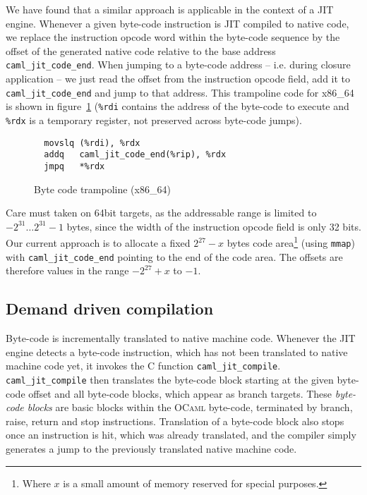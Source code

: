 \documentclass[10pt,a4paper,twocolumn]{article}
\begin{document}
We have found that a similar approach is applicable in the context of a JIT engine. Whenever a
given byte-code instruction is JIT compiled to native code, we replace the instruction opcode word
within the byte-code sequence by the offset of the generated native code relative to the base address
\texttt{caml\_jit\_code\_end}. When jumping to a byte-code address -- i.e. during closure application -- we
just read the offset from the instruction opcode field, add it to \texttt{caml\_jit\_code\_end} and jump to that
address. This trampoline code for x86\_64 is shown in figure~\ref{figure:Byte_code_trampoline_x86_64}
(\texttt{\%rdi} contains the address of the byte-code to execute and \texttt{\%rdx} is a temporary
register, not preserved across byte-code jumps).

\begin{figure}[ht]
  \centering
  \begin{verbatim}
  movslq (%rdi), %rdx
  addq   caml_jit_code_end(%rip), %rdx
  jmpq   *%rdx
\end{verbatim}
  \caption{Byte code trampoline (x86\_64)}
  \label{figure:Byte_code_trampoline_x86_64}
\end{figure}

Care must taken on 64bit targets, as the addressable range is limited to $-2^{31} \ldots 2^{31}-1$ bytes,
since the width of the instruction opcode field is only 32 bits. Our current approach is to allocate
a fixed $2^{27}-x$ bytes code area\footnote{Where $x$ is a small amount of memory reserved for special purposes.}
(using \texttt{mmap}) with \texttt{caml\_jit\_code\_end} pointing to the end of the code area.
The offsets are therefore values in the range $-2^{27}+x$ to $-1$.

\subsection{Demand driven compilation}

Byte-code is incrementally translated to native machine code. Whenever the JIT engine detects a
byte-code instruction, which has not been translated to native machine code yet, it invokes the
C function \texttt{caml\_jit\_compile}. \texttt{caml\_jit\_compile} then translates the byte-code
block starting at the given byte-code offset and all byte-code blocks, which appear as branch
targets. These \emph{byte-code blocks} are basic blocks within the \textsc{OCaml} byte-code,
terminated by branch, raise, return and stop instructions. Translation of a byte-code block also
stops once an instruction is hit, which was already translated, and the compiler simply generates
a jump to the previously translated native machine code.
\end{document}
